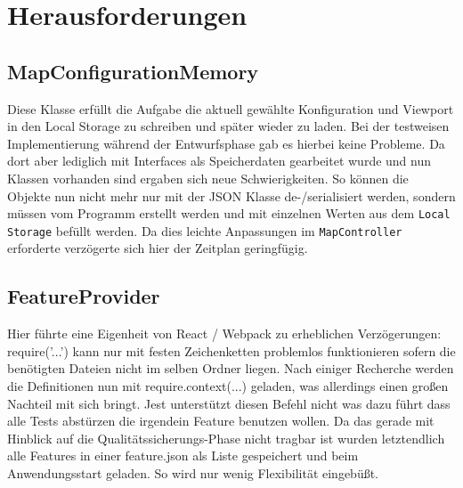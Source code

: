 \section{Herausforderungen}

\subsection{MapConfigurationMemory}

Diese Klasse erfüllt die Aufgabe die aktuell gewählte Konfiguration und Viewport in den 
Local Storage zu schreiben und später wieder zu laden. Bei der testweisen Implementierung während
der Entwurfsphase gab es hierbei keine Probleme. Da dort aber lediglich mit Interfaces als Speicherdaten
gearbeitet wurde und nun Klassen vorhanden sind ergaben sich neue Schwierigkeiten.
So können die Objekte nun nicht mehr nur mit der JSON Klasse de-/serialisiert werden, sondern müssen
vom Programm erstellt werden und mit einzelnen Werten aus dem \texttt{Local Storage} befüllt werden.
Da dies leichte Anpassungen im \texttt{MapController} erforderte verzögerte sich hier der Zeitplan 
geringfügig.

\subsection{FeatureProvider}

Hier führte eine Eigenheit von React / Webpack zu erheblichen Verzögerungen: 
require('...') kann nur mit festen Zeichenketten problemlos funktionieren sofern die benötigten
Dateien nicht im selben Ordner liegen. Nach einiger Recherche werden die Definitionen nun mit 
require.context(...) geladen, was allerdings einen großen Nachteil mit sich bringt.
Jest unterstützt diesen Befehl nicht was dazu führt dass alle Tests abstürzen die irgendein Feature
benutzen wollen.
Da das gerade mit Hinblick auf die Qualitätssicherungs-Phase nicht tragbar ist wurden letztendlich
alle Features in einer feature.json als Liste gespeichert und beim Anwendungsstart geladen.
So wird nur wenig Flexibilität eingebüßt.
